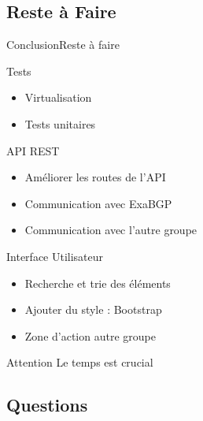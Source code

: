 \subsection{Reste à Faire}

\begin{frame}{Conclusion}{Reste à faire}
        \begin{block}{Tests}
            \begin{itemize}
                \item \alert{Virtualisation}
                \item Tests unitaires
            \end{itemize}
          \end{block}
    \begin{minipage}{0.46\textwidth}
        \begin{block}{API REST}
            \begin{itemize}
                \item Améliorer les routes de l'API
                \item Communication avec ExaBGP
                \item Communication avec l'autre groupe
            \end{itemize}
        \end{block}
    \end{minipage}
    \begin{minipage}{0.46\textwidth}
    	\begin{block}{Interface Utilisateur}
    	    \begin{itemize}
        	    \item Recherche et trie des éléments
        	    \item Ajouter du style : Bootstrap
        	    \item Zone d'action autre groupe
        	\end{itemize}
    	\end{block}
    \end{minipage}
    \begin{alertblock}{Attention}
    Le temps est crucial
    \end{alertblock}
\end{frame}

\subsection{Questions}

{
\begin{frame}[plain]
    
\end{frame}
}